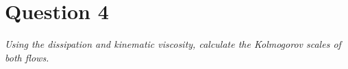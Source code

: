 \section*{Question 4}
\textit{Using the dissipation and kinematic viscosity, calculate the Kolmogorov scales of both flows.}